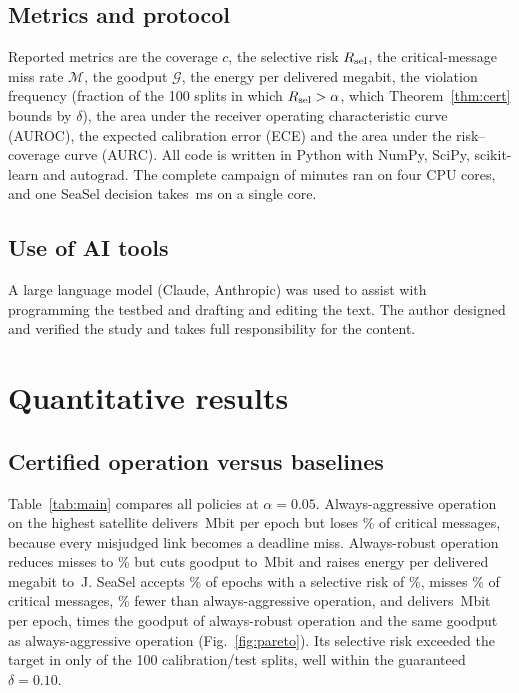 \subsection{Metrics and protocol}
Reported metrics are the coverage $c$, the selective risk $R_{\rm sel}$, the critical-message miss rate $\mathcal M$, the goodput $\mathcal G$, the energy per delivered megabit, the violation frequency (fraction of the 100 splits in which $R_{\rm sel}>\alpha$, which Theorem~\ref{thm:cert} bounds by $\delta$), the area under the receiver operating characteristic curve (AUROC), the expected calibration error (ECE) and the area under the risk--coverage curve (AURC). All code is written in Python with NumPy, SciPy, scikit-learn and autograd. The complete campaign of \RRuntime{} minutes ran on four CPU cores, and one SeaSel decision takes \RMsDec{}\,ms on a single core.

\subsection{Use of AI tools}
A large language model (Claude, Anthropic) was used to assist with programming the testbed and drafting and editing the text. The author designed and verified the study and takes full responsibility for the content.

\section{Quantitative results}\label{sec:results}
\subsection{Certified operation versus baselines}
Table~\ref{tab:main} compares all policies at $\alpha=0.05$. Always-aggressive operation on the highest satellite delivers \RAAGood{}\,Mbit per epoch but loses \RAAMiss\% of critical messages, because every misjudged link becomes a deadline miss. Always-robust operation reduces misses to \RARMiss\% but cuts goodput to \RARGood{}\,Mbit and raises energy per delivered megabit to \RAREnergy{}\,J. SeaSel accepts \RSCov\% of epochs with a selective risk of \RSRisk\%, misses \RSMiss\% of critical messages, \RMissRed\% fewer than always-aggressive operation, and delivers \RSGood{}\,Mbit per epoch, \RGoodRatio{} times the goodput of always-robust operation and the same goodput as always-aggressive operation (Fig.~\ref{fig:pareto}). Its selective risk exceeded the target in only \RSViol{} of the 100 calibration/test splits, well within the guaranteed $\delta=0.10$.

